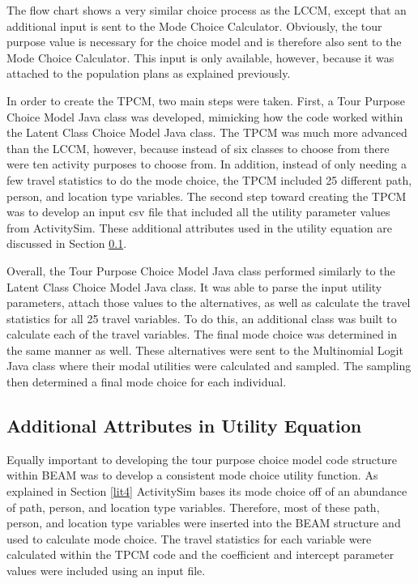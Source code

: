 \documentclass[12pt, oneside, openright]{byuthesis}
\begin{document}
The flow chart shows a very similar choice process as the LCCM, except that an additional input is sent to the Mode Choice Calculator. Obviously, the tour purpose value is necessary for the choice model and is therefore also sent to the Mode Choice Calculator. This input is only available, however, because it was attached to the population plans as explained previously.

In order to create the TPCM, two main steps were taken. First, a Tour Purpose Choice Model Java class was developed, mimicking how the code worked within the Latent Class Choice Model Java class. The TPCM was much more advanced than the LCCM, however, because instead of six classes to choose from there were ten activity purposes to choose from. In addition, instead of only needing a few travel statistics to do the mode choice, the TPCM included 25 different path, person, and location type variables. The second step toward creating the TPCM was to develop an input csv file that included all the utility parameter values from ActivitySim. These additional attributes used in the utility equation are discussed in Section \ref{ute}.

Overall, the Tour Purpose Choice Model Java class performed similarly to the Latent Class Choice Model Java class. It was able to parse the input utility parameters, attach those values to the alternatives, as well as calculate the travel statistics for all 25 travel variables. To do this, an additional class was built to calculate each of the travel variables. The final mode choice was determined in the same manner as well. These alternatives were sent to the Multinomial Logit Java class where their modal utilities were calculated and sampled. The sampling then determined a final mode choice for each individual.

\hypertarget{ute}{%
\subsection{Additional Attributes in Utility Equation}\label{ute}}

Equally important to developing the tour purpose choice model code structure within BEAM was to develop a consistent mode choice utility function. As explained in Section \ref{lit4} ActivitySim bases its mode choice off of an abundance of path, person, and location type variables. Therefore, most of these path, person, and location type variables were inserted into the BEAM structure and used to calculate mode choice. The travel statistics for each variable were calculated within the TPCM code and the coefficient and intercept parameter values were included using an input file.
\end{document}
